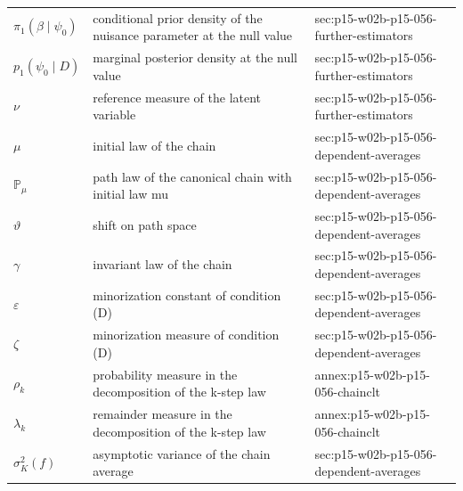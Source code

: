 \begin{longtable}{@{}p{}p{}p{}@{}}
\(\pi_1(\beta\mid\psi_0)\) & conditional prior density of the nuisance parameter at the null value & sec:\allowbreak{}p15-\allowbreak{}w02b-\allowbreak{}p15-\allowbreak{}056-\allowbreak{}further-\allowbreak{}estimators \\
\(p_1(\psi_0\mid D)\) & marginal posterior density at the null value & sec:\allowbreak{}p15-\allowbreak{}w02b-\allowbreak{}p15-\allowbreak{}056-\allowbreak{}further-\allowbreak{}estimators \\
\(\nu\) & reference measure of the latent variable & sec:\allowbreak{}p15-\allowbreak{}w02b-\allowbreak{}p15-\allowbreak{}056-\allowbreak{}further-\allowbreak{}estimators \\
\(\mu\) & initial law of the chain & sec:\allowbreak{}p15-\allowbreak{}w02b-\allowbreak{}p15-\allowbreak{}056-\allowbreak{}dependent-\allowbreak{}averages \\
\(\mathbb P_\mu\) & path law of the canonical chain with initial law mu & sec:\allowbreak{}p15-\allowbreak{}w02b-\allowbreak{}p15-\allowbreak{}056-\allowbreak{}dependent-\allowbreak{}averages \\
\(\vartheta\) & shift on path space & sec:\allowbreak{}p15-\allowbreak{}w02b-\allowbreak{}p15-\allowbreak{}056-\allowbreak{}dependent-\allowbreak{}averages \\
\(\gamma\) & invariant law of the chain & sec:\allowbreak{}p15-\allowbreak{}w02b-\allowbreak{}p15-\allowbreak{}056-\allowbreak{}dependent-\allowbreak{}averages \\
\(\varepsilon\) & minorization constant of condition (D) & sec:\allowbreak{}p15-\allowbreak{}w02b-\allowbreak{}p15-\allowbreak{}056-\allowbreak{}dependent-\allowbreak{}averages \\
\(\zeta\) & minorization measure of condition (D) & sec:\allowbreak{}p15-\allowbreak{}w02b-\allowbreak{}p15-\allowbreak{}056-\allowbreak{}dependent-\allowbreak{}averages \\
\(\rho_k\) & probability measure in the decomposition of the k-step law & annex:\allowbreak{}p15-\allowbreak{}w02b-\allowbreak{}p15-\allowbreak{}056-\allowbreak{}chainclt \\
\(\lambda_k\) & remainder measure in the decomposition of the k-step law & annex:\allowbreak{}p15-\allowbreak{}w02b-\allowbreak{}p15-\allowbreak{}056-\allowbreak{}chainclt \\
\(\sigma^2_K(f)\) & asymptotic variance of the chain average & sec:\allowbreak{}p15-\allowbreak{}w02b-\allowbreak{}p15-\allowbreak{}056-\allowbreak{}dependent-\allowbreak{}averages \\

\end{longtable}

